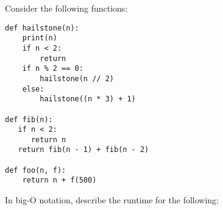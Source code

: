 \begin{blocksection}
\question Consider the following functions: 
\begin{lstlisting}
def hailstone(n):
    print(n)
    if n < 2:
        return
    if n % 2 == 0:
        hailstone(n // 2)
    else:
        hailstone((n * 3) + 1)

def fib(n):
   if n < 2:
      return n
   return fib(n - 1) + fib(n - 2)

def foo(n, f):
    return n + f(500)
\end{lstlisting}
In big-O notation, describe the runtime for the following:

\end{blocksection}

